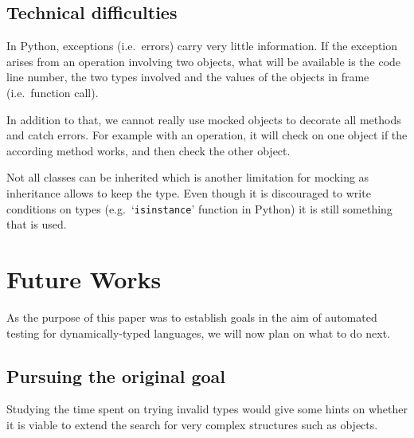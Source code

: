 \documentclass{llncs2e/llncs}
\makeatletter
\def\todo#1{{\color{red}TODO\@: #1}}
\makeatother
\begin{document}
\subsection{Technical difficulties}
\label{tech_difficulties}

In Python, exceptions (i.e.\ errors) carry very little information. If the
exception arises from an operation involving two objects, what will be available
is the code line number, the two types involved and the values of the objects in
frame (i.e.\ function call).

In addition to that, we cannot really use mocked objects to decorate all methods
and catch errors. For example with an operation, it will check on one object if
the according method works, and then check the other object.

Not all classes can be inherited which is another limitation for mocking as
inheritance allows to keep the type. Even though it is discouraged to write
conditions on types (e.g.\ `\texttt{isinstance}' function in Python) it is still
something that is used.







\section{Future Works}
\label{futureworks}

As the purpose of this paper was to establish goals in the aim of automated
testing for dynamically-typed languages, we will now plan on what to do next.

\subsection{Pursuing the original goal}

Studying the time spent on trying invalid types would give some hints on whether
it is viable to extend the search for very complex structures such as objects.

\end{document}
